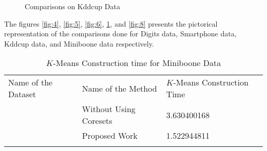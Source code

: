 \documentclass[runningheads]{llncs}
\begin{document}
\begin{figure}[!hbt]
	\hspace{0mm}
	\hspace{0mm}
	\caption{Comparisons on Kddcup Data }
	\label{fig:7}     
\end{figure}

The figures \ref{fig:4}, \ref{fig:5}, \ref{fig:6}, \ref{fig:7}, and \ref{fig:8} presents the pictorical representation of the comparisons done for Digits data, Smartphone data, Kddcup data, and Miniboone data respectively.


\begin{table}[!hbt]
	\caption{$K$-Means Construction time for Miniboone Data}
	\label{tab:21}       %
	\begin{tabular}{p{3cm}p{4cm}p{3.4cm}}
		\hline\noalign{\smallskip}
		Name of the Dataset & Name of the Method & $K$-Means Construction Time  \\
		\noalign{\smallskip}\hline\noalign{\smallskip}
		\multirow{2}{*}{Miniboone Data} & Without Using Coresets & 3.630400168\\
		& Proposed Work  & 1.522944811\\
		\noalign{\smallskip}\hline\noalign{\smallskip}
	\end{tabular}
\end{table}
\end{document}
